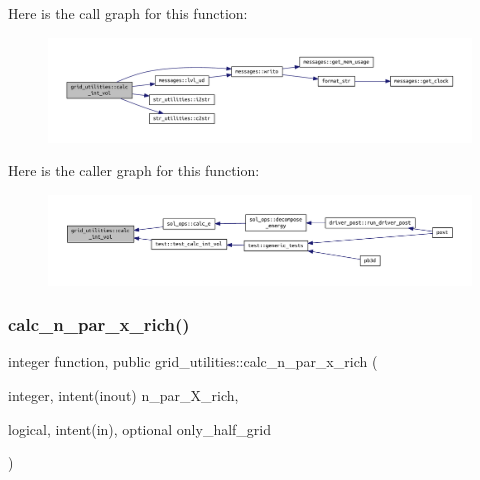 Here is the call graph for this function\+:
\nopagebreak
\begin{figure}[H]
\begin{center}
\leavevmode
\includegraphics[width=350pt]{namespacegrid__utilities_a97e3106dbdc10b726af74afa113ba533_cgraph}
\end{center}
\end{figure}
Here is the caller graph for this function\+:
\nopagebreak
\begin{figure}[H]
\begin{center}
\leavevmode
\includegraphics[width=350pt]{namespacegrid__utilities_a97e3106dbdc10b726af74afa113ba533_icgraph}
\end{center}
\end{figure}
\mbox{\label{namespacegrid__utilities_adeb8c22db4d419a278d6fcc68a34100c}} 
\subsubsection{\texorpdfstring{calc\+\_\+n\+\_\+par\+\_\+x\+\_\+rich()}{calc\_n\_par\_x\_rich()}}
{\footnotesize\ttfamily integer function, public grid\+\_\+utilities\+::calc\+\_\+n\+\_\+par\+\_\+x\+\_\+rich (\begin{DoxyParamCaption}\item[{integer, intent(inout)}]{n\+\_\+par\+\_\+\+X\+\_\+rich,  }\item[{logical, intent(in), optional}]{only\+\_\+half\+\_\+grid }\end{DoxyParamCaption})}



